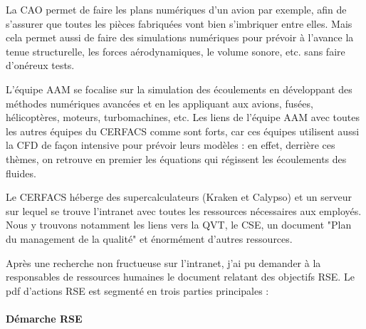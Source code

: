 
La \ac{CAO} permet de faire les plans numériques d'un avion par exemple, afin de s'assurer que toutes les pièces fabriquées vont bien s'imbriquer entre elles. Mais cela permet aussi de faire des simulations numériques pour prévoir à l'avance la tenue structurelle, les forces aérodynamiques, le volume sonore, etc. sans faire d'onéreux tests.

L'équipe AAM se focalise sur la simulation des écoulements en développant des méthodes numériques avancées et en les appliquant aux avions, fusées, hélicoptères, moteurs, turbomachines, etc. Les liens de l’équipe AAM avec toutes les autres équipes du CERFACS comme sont forts, car ces équipes utilisent aussi la CFD de façon intensive pour prévoir leurs modèles : en effet, derrière ces thèmes, on retrouve en premier les équations qui régissent les écoulements des fluides.

\hspace{0,5cm}

Le CERFACS héberge des supercalculateurs (Kraken et Calypso) et un serveur sur lequel se trouve l'intranet avec toutes les ressources nécessaires aux employés.
Nous y trouvons notamment les liens vers la \ac{QVT}, le \ac{CSE}, un document "Plan du management de la qualité" et énormément d'autres ressources.







\newpage

Après une recherche non fructueuse sur l'intranet, j'ai pu demander à la responsables de ressources humaines le document relatant des objectifs \ac{RSE}. Le pdf d'actions RSE est segmenté en trois parties principales :

\paragraph{Démarche RSE}


